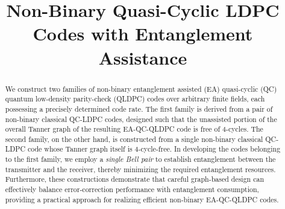 \documentclass[conference]{IEEEtran}
\begin{document}


\title{Non-Binary Quasi-Cyclic LDPC Codes with Entanglement Assistance}
 \author{
 }
\maketitle
\begin{abstract}
We construct two families of non-binary entanglement assisted (EA) quasi-cyclic (QC) quantum low-density parity-check (QLDPC) codes over arbitrary finite fields, each possessing a precisely determined code rate.
 The first family is derived from a pair of non-binary classical QC-LDPC codes, designed such that the unassisted portion of the overall Tanner graph of the resulting EA-QC-QLDPC code is free of 4-cycles. The second family, on the other hand, is constructed from a single non-binary classical QC-LDPC code whose Tanner graph itself is 4-cycle-free. In developing the codes belonging to the first family, we employ a \emph{single Bell pair} to establish entanglement between the transmitter and the receiver, thereby minimizing the required entanglement resources. Furthermore, these constructions demonstrate that careful graph-based design can effectively balance error-correction performance with entanglement consumption, providing a practical approach for realizing efficient non-binary EA-QC-QLDPC codes.

 \end{abstract}
\end{document}

